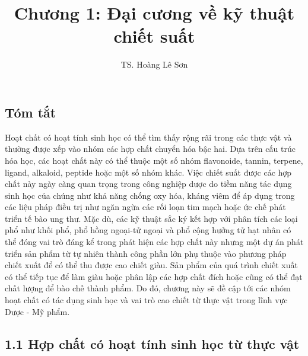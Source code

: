 \documentclass[
  letterpaper,
  DIV=11,
  numbers=noendperiod]{scrartcl}
\title{Chương 1: Đại cương về kỹ thuật chiết suất}
\author{TS. Hoàng Lê Sơn}
\date{}
\renewcommand*\contentsname{Table of contents}
\newcommand\contentsname{Table of contents}
\begin{document}
\maketitle

\renewcommand*\contentsname{Table of contents}
{
\hypersetup{linkcolor=}
\setcounter{tocdepth}{3}
\tableofcontents
}

\subsection{Tóm tắt}\label{tuxf3m-tux1eaft}

Hoạt chất có hoạt tính sinh học có thể tìm thấy rộng rãi trong các thực
vật và thường được xếp vào nhóm các hợp chất chuyển hóa bậc hai. Dựa
trên cấu trúc hóa học, các hoạt chất này có thể thuộc một số nhóm
flavonoide, tannin, terpene, ligand, alkaloid, peptide hoặc một số nhóm
khác. Việc chiết suất được các hợp chất này ngày càng quan trọng trong
công nghiệp dược do tiềm năng tác dụng sinh học của chúng như khả năng
chống oxy hóa, kháng viêm để áp dụng trong các liệu pháp điều trị như
ngăn ngừa các rối loạn tim mạch hoặc ức chế phát triển tế bào ung thư.
Mặc dù, các kỹ thuật sắc ký kết hợp với phân tích các loại phổ như khối
phổ, phổ hồng ngoại-tử ngoại và phổ cộng hưởng tử hạt nhân có thể đóng
vai trò đáng kể trong phát hiện các hợp chất này nhưng một dự án phát
triển sản phẩm từ tự nhiên thành công phần lớn phụ thuộc vào phương pháp
chiết xuất để có thể thu được cao chiết giàu. Sản phẩm của quá trình
chiết xuất có thể tiếp tục để làm giàu hoặc phân lập các hợp chất đích
hoặc cũng có thể đạt chất lượng để bào chế thành phẩm. Do đó, chương này
sẽ đề cập tới các nhóm hoạt chất có tác dụng sinh học và vai trò cao
chiết từ thực vật trong lĩnh vực Dược - Mỹ phẩm.

\subsection{1.1 Hợp chất có hoạt tính sinh học từ thực
vật}\label{hux1ee3p-chux1ea5t-cuxf3-houx1ea1t-tuxednh-sinh-hux1ecdc-tux1eeb-thux1ef1c-vux1eadt}
\end{document}
